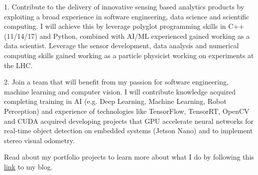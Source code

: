 

\begin{cvparagraph}


1. Contribute to the delivery of innovative sensing based analytics products by 
exploiting a broad experience in software engineering, data science and 
scientific computing. I will achieve this by leverage polyglot programming skills 
in C++(11/14/17) and Python, combined with AI/ML experienced gained working as a data 
scientist. Leverage the
sensor development, data analysis and numerical computing skills gained working as a particle physicist 
working on experiments at the LHC.

2. Join a team that will benefit from my passion for software engineering, 
machine learning and computer vision. I will contribute knowledge acquired completing training
in AI (e.g. Deep Learning, Machine Learning, Robot Perception) and experience of
technologies like TensorFlow, TensorRT, OpenCV and CUDA acquired developing projects 
that GPU accelerate neural networks for real-time object detection on 
embedded systems (Jetson Nano) and to implement stereo visual odometry.

Read about my portfolio projects to learn more about what I do
by following this \href{https://presland.io}{\color{awesome-red}link} to my blog.

\end{cvparagraph}